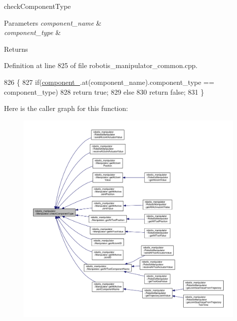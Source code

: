 check\+Component\+Type 


\begin{DoxyParams}{Parameters}
{\em component\+\_\+name} & \\
\hline
{\em component\+\_\+type} & \\
\hline
\end{DoxyParams}
\begin{DoxyReturn}{Returns}

\end{DoxyReturn}


Definition at line 825 of file robotis\+\_\+manipulator\+\_\+common.\+cpp.


\begin{DoxyCode}
826 \{
827   \textcolor{keywordflow}{if}(\hyperlink{classrobotis__manipulator_1_1_manipulator_a20b388b821f161972c2cf737fe1c26db}{component\_}.at(component\_name).component\_type == component\_type)
828     \textcolor{keywordflow}{return} \textcolor{keyword}{true};
829   \textcolor{keywordflow}{else}
830     \textcolor{keywordflow}{return} \textcolor{keyword}{false};
831 \}
\end{DoxyCode}


Here is the caller graph for this function\+:\nopagebreak
\begin{figure}[H]
\begin{center}
\leavevmode
\includegraphics[width=350pt]{classrobotis__manipulator_1_1_manipulator_a5b1f27b9cc2875b4e0275e3b88ab1b28_icgraph}
\end{center}
\end{figure}


